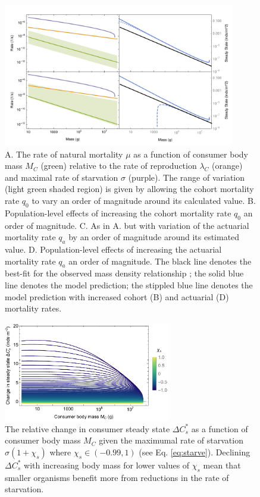 \documentclass[]{rsos}%
\begin{document}
\begin{figure}
    \centering
    \includegraphics[width=0.9\textwidth]{joined_survivorship.pdf}
    \caption{
        A. The rate of natural mortality $\mu$ as a function of consumer body mass $M_C$ (green) relative to  the rate of reproduction $\lambda_C$ (orange) and maximal rate of starvation $\sigma$ (purple). The range of variation (light green shaded region) is given by allowing the cohort mortality rate $q_0$ to vary an order of magnitude around its calculated value.
        B. Population-level effects of increasing the cohort mortality rate $q_0$ an order of magnitude. 
        C. As in A. but with variation of the actuarial mortality rate $q_a$ by an order of magnitude around its estimated value.
        D. Population-level effects of increasing the actuarial mortality rate $q_a$ an order of magnitude.
        The black line denotes the best-fit for the observed mass density relationship \cite{Damuth1987}; the solid blue line denotes the model prediction; the stippled blue line denotes the model prediction with increased cohort (B) and actuarial (D) mortality rates.
    }
    \label{fig:naturalmort}
\end{figure}


\begin{figure}
    \centering
    \includegraphics[width=0.65\textwidth]{fig_starverelative.pdf}
    \caption{
    The relative change in consumer steady state $\Delta C^*_s$ as a function of consumer body mass $M_C$ given the maximumal rate of starvation $\sigma(1 +\chi_s)$ where $\chi_s \in (-0.99,1)$ (see Eq. \ref{eq:starve}).
    Declining $\Delta C^*_s$ with increasing body mass for lower values of $\chi_s$ mean that smaller organisms benefit more from reductions in the rate of starvation.
    }
    \label{fig:starve}
\end{figure}
\end{document}
